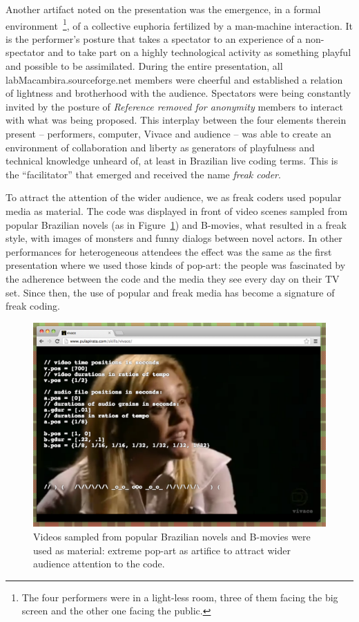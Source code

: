 \documentclass[letterpaper, 12pt]{article}
\begin{document}
Another artifact noted on the presentation was the emergence, in a
formal environment~\footnote{The four performers were in a light-less
  room, three of them facing the big screen and the other one facing
  the public.}, of a collective euphoria fertilized by a man-machine
interaction. It is the performer's posture that takes a spectator to
an experience of a non-spectator and to take part on a highly
technological activity as something playful and possible to be
assimilated.  During the entire presentation, all
labMacambira.sourceforge.net members were cheerful and established a
relation of lightness and brotherhood with the audience.  Spectators
were being constantly invited by the posture of \textit{Reference
  removed for anonymity} members to interact with what was being
proposed.  This interplay between the four elements therein present --
performers, computer, Vivace and audience -- was able to create an
environment of collaboration and liberty as generators of playfulness
and technical knowledge unheard of, at least in Brazilian live coding
terms. This is the ``facilitator'' that emerged and received the name
\emph{freak coder}.

To attract the attention of the wider audience, we as freak coders
used popular media as material. The code was displayed in front of
video scenes sampled from popular Brazilian novels (as in
Figure~\ref{fig:novela}) and B-movies, what resulted in a freak style,
with images of monsters and funny dialogs between novel actors. In
other performances for heterogeneous attendees the effect was the same
as the first presentation where we used those kinds of pop-art: the
people was fascinated by the adherence between the code and the media
they see every day on their TV set. Since then, the use of popular and
freak media has become a signature of freak coding.

\begin{figure}[htpb]
  \begin{center}
    \includegraphics[scale=.3]{img/fig_novela.png}
    \caption{Videos sampled from popular Brazilian novels and B-movies
      were used as material: extreme pop-art as artifice to attract
      wider audience attention to the code.}
    \label{fig:novela}
  \end{center}
\end{figure}
\end{document}
